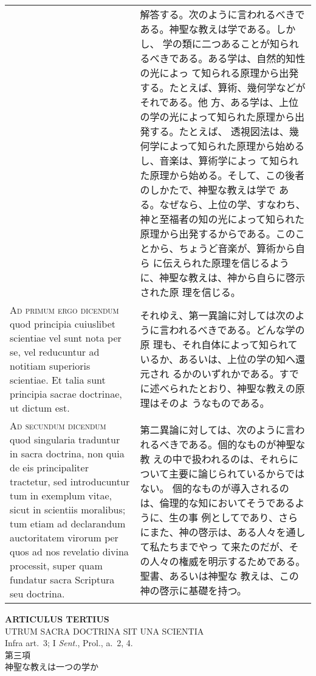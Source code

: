\documentclass[10pt]{jsarticle}
\begin{document}
\begin{longtable}{p{21em}p{21em}}
&

解答する。次のように言われるべきである。神聖な教えは学である。しかし、
学の類に二つあることが知られるべきである。ある学は、自然的知性の光によっ
て知られる原理から出発する。たとえば、算術、幾何学などがそれである。他
方、ある学は、上位の学の光によって知られた原理から出発する。たとえば、
透視図法は、幾何学によって知られた原理から始めるし、音楽は、算術学によっ
て知られた原理から始める。そして、この後者のしかたで、神聖な教えは学で
ある。なぜなら、上位の学、すなわち、神と至福者の知の光によって知られた
原理から出発するからである。このことから、ちょうど音楽が、算術から自ら
に伝えられた原理を信じるように、神聖な教えは、神から自らに啓示された原
理を信じる。



\\


{\scshape Ad primum ergo dicendum} quod principia cuiuslibet scientiae
vel sunt nota per se, vel reducuntur ad notitiam superioris
scientiae. Et talia sunt principia sacrae doctrinae, ut dictum est.


&

それゆえ、第一異論に対しては次のように言われるべきである。どんな学の原
理も、それ自体によって知られているか、あるいは、上位の学の知へ還元され
るかのいずれかである。すでに述べられたとおり、神聖な教えの原理はそのよ
うなものである。

\\


{\scshape Ad secundum dicendum} quod singularia traduntur in sacra
doctrina, non quia de eis principaliter tractetur, sed introducuntur
tum in exemplum vitae, sicut in scientiis moralibus; tum etiam ad
declarandum auctoritatem virorum per quos ad nos revelatio divina
processit, super quam fundatur sacra Scriptura seu doctrina.


&

第二異論に対しては、次のように言われるべきである。個的なものが神聖な教
えの中で扱われるのは、それらについて主要に論じられているからではない。
個的なものが導入されるのは、倫理的な知においてそうであるように、生の事
例としてであり、さらにまた、神の啓示は、ある人々を通して私たちまでやっ
て来たのだが、その人々の権威を明示するためである。聖書、あるいは神聖な
教えは、この神の啓示に基礎を持つ。




\end{longtable}
\newpage

\begin{center}
 {\Large {\bf ARTICULUS TERTIUS}}\\
 {\large UTRUM SACRA DOCTRINA SIT UNA SCIENTIA}\\
 {\footnotesize Infra art.~3; I {\itshape Sent.}, Prol., a.~2, 4.}\\
 {\Large 第三項\\神聖な教えは一つの学か}
\end{center}
\end{document}

